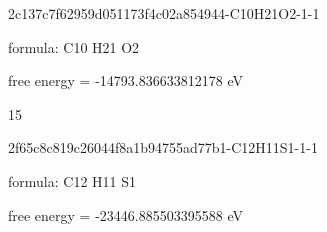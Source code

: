 \documentclass{article}
\begin{document}
\vspace{1cm}


2c137c7f62959d051173f4c02a854944-C10H21O2-1-1



formula: C10 H21 O2



free energy = -14793.836633812178 eV

15

\vspace{1cm}


2f65c8c819c26044f8a1b94755ad77b1-C12H11S1-1-1



formula: C12 H11 S1



free energy = -23446.885503395588 eV
\end{document}
